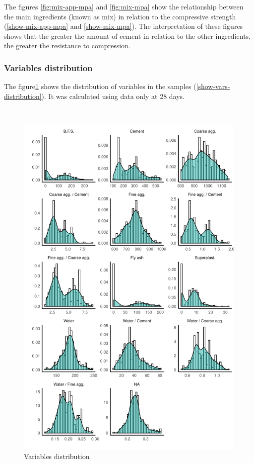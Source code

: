 \documentclass[
]{article}
\begin{document}
The figures \ref{fig:mix-app-mpa} and \ref{fig:mix-mpa} show the
relationship between the main ingredients (known as mix) in relation to
the compressive strength (\ref{show-mix-app-mpa} and
\ref{show-mix-mpa}). The interpretation of these figures shows that the
greater the amount of cement in relation to the other ingredients, the
greater the resistance to compression.

\hypertarget{variables-distribution}{%
\subsubsection{Variables distribution}\label{variables-distribution}}

The figure\ref{fig:vars-distribution} shows the distribution of
variables in the samples (\ref{show-vars-distribution}). It was
calculated using data only at 28 days.

~

\begin{figure}

{\centering \includegraphics{paper_EN_files/figure-latex/vars-distribution-1} 

}

\caption{Variables distribution}\label{fig:vars-distribution}
\end{figure}
\end{document}
